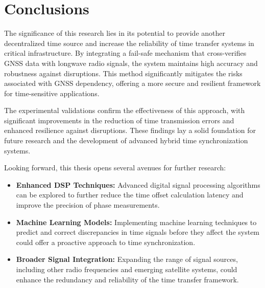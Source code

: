 \documentclass[12pt, a4paper]{extarticle}
\begin{document}
\pagebreak
\section{Conclusions}\label{sec:concl}


The significance of this research lies in its potential to provide another
decentralized time source and increase the reliability of time transfer systems
in critical infrastructure. By integrating a fail-safe mechanism that
cross-verifies GNSS data with longwave radio signals, the system maintains high
accuracy and robustness against disruptions. This method significantly
mitigates the risks associated with GNSS dependency, offering a more secure and
resilient framework for time-sensitive applications.

The experimental validations confirm the effectiveness of this approach, with
significant improvements in the reduction of time transmission errors and
enhanced resilience against disruptions. These findings lay a solid foundation
for future research and the development of advanced hybrid time synchronization
systems.

Looking forward, this thesis opens several avenues for further research:
\begin{itemize}[noitemsep]
    \item \textbf{Enhanced DSP Techniques:} Advanced digital signal processing
        algorithms can be explored to further reduce the time offset
        calculation latency and improve the precision of phase measurements.
    \item \textbf{Machine Learning Models:} Implementing machine learning
        techniques to predict and correct discrepancies in time signals before
        they affect the system could offer a proactive approach to time
        synchronization.
    \item \textbf{Broader Signal Integration:} Expanding the range of signal
        sources, including other radio frequencies and emerging satellite
        systems, could enhance the redundancy and reliability of the time
        transfer framework.
\end{itemize}
\end{document}
